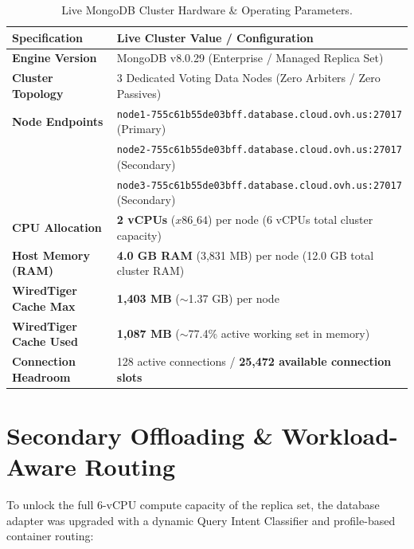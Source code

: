 \documentclass[11pt,a4paper]{article}
\begin{document}
\begin{table}[h!]
\centering
\small
\begin{tabularx}{\textwidth}{lX}
\toprule
\textbf{Specification} & \textbf{Live Cluster Value / Configuration} \\
\midrule
\textbf{Engine Version} & MongoDB v8.0.29 (Enterprise / Managed Replica Set) \\
\textbf{Cluster Topology} & 3 Dedicated Voting Data Nodes (Zero Arbiters / Zero Passives) \\
\textbf{Node Endpoints} & \texttt{node1-755c61b55de03bff.database.cloud.ovh.us:27017} (Primary) \\
 & \texttt{node2-755c61b55de03bff.database.cloud.ovh.us:27017} (Secondary) \\
 & \texttt{node3-755c61b55de03bff.database.cloud.ovh.us:27017} (Secondary) \\
\textbf{CPU Allocation} & \textbf{2 vCPUs} ($x86\_64$) per node (6 vCPUs total cluster capacity) \\
\textbf{Host Memory (RAM)} & \textbf{4.0 GB RAM} (3,831 MB) per node (12.0 GB total cluster RAM) \\
\textbf{WiredTiger Cache Max} & \textbf{1,403 MB} ($\sim$1.37 GB) per node \\
\textbf{WiredTiger Cache Used} & \textbf{1,087 MB} ($\sim$77.4\% active working set in memory) \\
\textbf{Connection Headroom} & 128 active connections / \textbf{25,472 available connection slots} \\
\bottomrule
\end{tabularx}
\caption{Live MongoDB Cluster Hardware \& Operating Parameters.}
\end{table}

\section{Secondary Offloading \& Workload-Aware Routing}

To unlock the full 6-vCPU compute capacity of the replica set, the database adapter was upgraded with a dynamic Query Intent Classifier and profile-based container routing:
\end{document}
